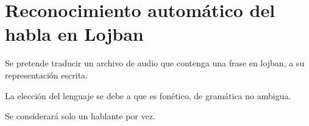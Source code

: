 \documentclass[a4paper,10pt]{article}
\begin{document}
\section{Reconocimiento automático del habla en Lojban}
	Se pretende traducir un archivo de audio que contenga una frase en lojban, a su representación escrita.

	La elección del lenguaje se debe a que es fonético, de gramática no ambigua.

	Se considerará solo un hablante por vez. 
\end{document}
